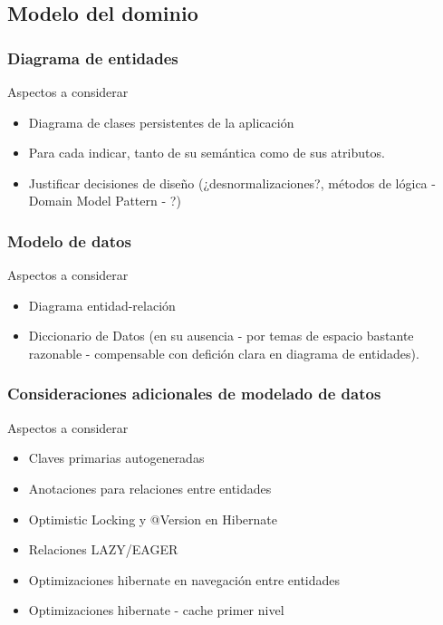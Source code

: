 \subsection{Modelo del dominio}

\subsubsection{Diagrama de entidades}

{ \color{red} Aspectos a considerar
    \begin{itemize}
      \item Diagrama de clases persistentes de la aplicación
      \item Para cada indicar, tanto de su semántica como de sus atributos.
      \item Justificar decisiones de diseño (¿desnormalizaciones?, métodos de lógica - Domain Model Pattern - ?)
    \end{itemize}
}
\subsubsection{Modelo de datos}

{ \color{red} Aspectos a considerar
    \begin{itemize}
      \item Diagrama entidad-relación
      \item Diccionario de Datos (en su ausencia - por temas de espacio bastante razonable - compensable con defición clara en diagrama de entidades).
    \end{itemize}
}

\subsubsection{Consideraciones adicionales de modelado de datos}

{ \color{red} Aspectos a considerar
    \begin{itemize}
      \item Claves primarias autogeneradas
      \item Anotaciones para relaciones entre entidades
      \item Optimistic Locking y @Version en Hibernate
      \item Relaciones LAZY/EAGER
      \item Optimizaciones hibernate en navegación entre entidades
      \item Optimizaciones hibernate - cache primer nivel
    \end{itemize}
}


